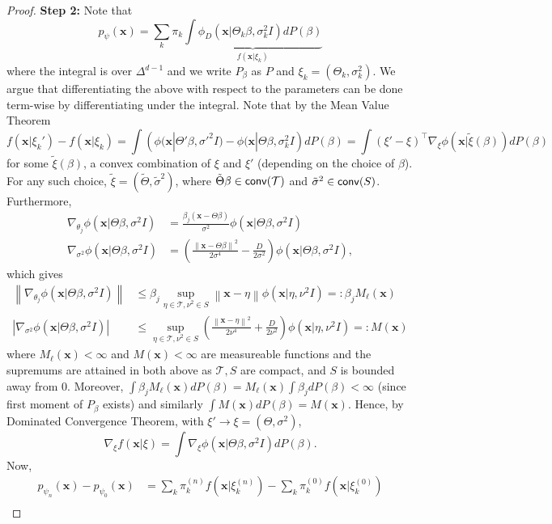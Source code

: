 \documentclass[bj,authoryear]{imsart}
\theoremstyle{plain}
\theoremstyle{remark}
\def\bx{\mathbf{x}}
\def\cT{\mathcal{T}}
\def\conv{{\sf conv}}
\def\norm#1{\left\|#1\right\|}
\begin{document}
\begin{appendix}
\begin{proof}
\vspace{1em}
\textbf{Step 2: } Note that
$$p_{\psi}(\bx) = \sum_k \pi_k \underbrace{\int \phi_D(\bx|\Theta_k\beta,\sigma_k^2I) dP(\beta)}_{f(\bx|\xi_k)}$$
where the integral is over $\Delta^{d-1}$ and we write $P_{\beta}$ as $P$ and $\xi_k=(\Theta_k,\sigma_k^2)$. We argue that differentiating the above with respect to the parameters can be done term-wise by differentiating under the integral. Note that by the Mean Value Theorem
$$f(\bx|\xi_k') - f(\bx|\xi_k) = \int \left(\phi(\bx|\Theta'\beta,\sigma'^2I) - \phi(\bx|\Theta\beta,\sigma_k^2I\right) dP(\beta) = \int (\xi'-\xi)^\top \nabla_{\xi} \phi(\bx|\tilde{\xi}(\beta)) dP(\beta)$$
for some $\tilde{\xi}(\beta)$, a convex combination of $\xi$ and $\xi'$ (depending on the choice of $\beta$). For any such choice, $\tilde{\xi}=(\tilde{\Theta},\tilde{\sigma}^2)$, where $\tilde{\Theta}\beta\in \conv(\cT)$ and $\tilde{\sigma}^2\in \conv(S)$. Furthermore, 
\begin{align*}
    \nabla_{\theta_j} \phi(\bx|\Theta\beta, \sigma^2 I) &= \frac{\beta_j(\bx - \Theta\beta)}{\sigma^2}\phi(\bx|\Theta\beta,\sigma^2I) \\
    \nabla_{\sigma^2} \phi(\bx|\Theta\beta, \sigma^2 I) &= \left(\frac{\norm{\bx - \Theta\beta}^2}{2\sigma^4} - \frac{D}{2\sigma^2}\right)\phi(\bx|\Theta\beta,\sigma^2I),
\end{align*}
which gives
\begin{align*}
    \norm{\nabla_{\theta_j} \phi(\bx|\Theta\beta, \sigma^2 I)} &\leq \beta_j \sup_{\eta\in\cT, \nu^2\in S} \norm{\bx-\eta}\phi(\bx|\eta, \nu^2 I) =: \beta_j M_{\ell}(\bx) \\
    \left|\nabla_{\sigma^2} \phi(\bx|\Theta\beta, \sigma^2 I)\right| &\leq \sup_{\eta\in\cT, \nu^2\in S} \left(\frac{\norm{\bx - \eta}^2}{2\nu^4} + \frac{D}{2\nu^2}\right)\phi(\bx|\eta,\nu^2I) =: M(\bx)
\end{align*}
where $M_{\ell}(\bx)<\infty$ and $M(\bx)<\infty$ are measureable functions and the supremums are attained in both above as $\cT,S$ are compact, and $S$ is bounded away from $0$. Moreover, $\int \beta_j M_{\ell}(\bx) dP(\beta) = M_{\ell}(\bx) \int \beta_j dP(\beta)<\infty$ (since first moment of $P_{\beta}$ exists) and similarly $\int M(\bx) dP(\beta) = M(\bx)$. Hence, by Dominated Convergence Theorem, with $\xi'\to \xi=(\Theta,\sigma^2)$,
$$\nabla_{\xi} f(\bx|\xi) = \int \nabla_{\xi} \phi(\bx|\Theta\beta,\sigma^2 I) dP(\beta).$$
Now,
\begin{align}
    p_{\psi_n}(\bx) - p_{\psi_0}(\bx) &= \sum_k \pi_k^{(n)} f(\bx|\xi_k^{(n)}) - \sum_k \pi_k^{(0)} f(\bx|\xi_k^{(0)}) \\

\end{align}
\end{proof}
\end{appendix}
\end{document}
